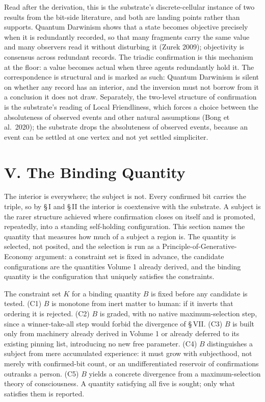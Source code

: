 \documentclass[11pt,oneside]{report}
\theoremstyle{definition}
\theoremstyle{remark}
\begin{document}
Read after the derivation, this is the substrate's discrete-cellular
instance of two results from the bit-side literature, and both are
landing points rather than supports. Quantum Darwinism shows that a state
becomes objective precisely when it is redundantly recorded, so that many
fragments carry the same value and many observers read it without
disturbing it (Zurek 2009); objectivity is consensus across redundant
records. The triadic confirmation is this mechanism at the floor: a value
becomes actual when three agents redundantly hold it. The correspondence
is structural and is marked as such: Quantum Darwinism is silent on
whether any record has an interior, and the inversion must not borrow
from it a conclusion it does not draw. Separately, the two-level
structure of confirmation is the substrate's reading of Local
Friendliness, which forces a choice between the absoluteness of observed
events and other natural assumptions (Bong et al.\ 2020); the substrate
drops the absoluteness of observed events, because an event can be
settled at one vertex and not yet settled simpliciter.

\section*{V. The Binding Quantity}

The interior is everywhere; the subject is not. Every confirmed bit carries
the triple, so by \S\,I and \S\,II the interior is coextensive with the
substrate. A subject is the rarer structure achieved where confirmation
closes on itself and is promoted, repeatedly, into a standing
self-holding configuration. This section names the quantity that measures
how much of a subject a region is. The quantity is selected, not posited,
and the selection is run as a Principle-of-Generative-Economy argument: a
constraint set is fixed in advance, the candidate configurations are the
quantities Volume 1 already derived, and the binding quantity is the
configuration that uniquely satisfies the constraints.

The constraint set \ensuremath{K} for a binding quantity \ensuremath{B} is
fixed before any candidate is tested. (C1) \ensuremath{B} is monotone from
inert matter to human: if it inverts that ordering it is rejected. (C2)
\ensuremath{B} is graded, with no native maximum-selection step, since a
winner-take-all step would forbid the divergence of \S\,VII. (C3)
\ensuremath{B} is built only from machinery already derived in Volume 1 or
already deferred to its existing pinning list, introducing no new free
parameter. (C4) \ensuremath{B} distinguishes a subject from mere
accumulated experience: it must grow with subjecthood, not merely with
confirmed-bit count, or an undifferentiated reservoir of confirmations
outranks a person. (C5) \ensuremath{B} yields a concrete divergence from a
maximum-selection theory of consciousness. A quantity satisfying all five
is sought; only what satisfies them is reported.
\end{document}
